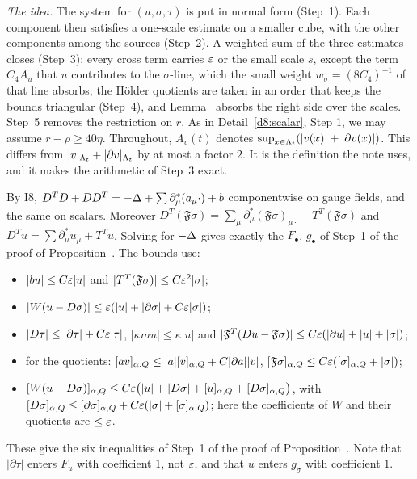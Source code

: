 \begin{detail}\label{d8:system}
\emph{The idea.} The system for $(u,\sigma,\tau)$ is put in normal form (Step~1). Each component then satisfies a one-scale estimate on a smaller cube, with the other components among the sources (Step~2). A weighted sum of the three estimates closes (Step~3): every cross term carries $\varepsilon$ or the small scale $s$, except the term $C_4A_u$ that $u$ contributes to the $\sigma$-line, which the small weight $w_\sigma=(8C_4)^{-1}$ of that line absorbs; the H\"older quotients are taken in an order that keeps the bounds triangular (Step~4), and Lemma~ absorbs the right side over the scales. Step~5 removes the restriction on $r$.
As in Detail~\ref{d8:scalar}, Step 1, we may assume $r-\rho\ge40\eta$. Throughout, $A_v(t)$ denotes $\sup_{x\in\Lambda_t}(|v(x)|+|\partial v(x)|)$. This differs from $|v|_{\Lambda_t}+|\partial v|_{\Lambda_t}$ by at most a factor $2$. It is the definition the note uses, and it makes the arithmetic of Step~3 exact.
\begin{step}
By I8, $D^TD+DD^T=-\Delta+\sum\partial^*_\mu(a_\mu\cdot)+b$ componentwise on gauge fields, and the same on scalars. Moreover $D^T(\mathfrak F\sigma)=\sum_\mu\partial^*_\mu(\mathfrak F\sigma)_{\mu\cdot}+T^T(\mathfrak F\sigma)$ and $D^Tu=\sum\partial^*_\mu u_\mu+T^Tu$. Solving  for $-\Delta$ gives exactly the $F_\bullet$, $g_\bullet$ of Step~1 of the proof of Proposition~. The bounds use:
\begin{itemize}
\item $|bu|\le C\varepsilon|u|$ and $|T^T(\mathfrak F\sigma)|\le C\varepsilon^2|\sigma|$;
\item $|W(u-D\sigma)|\le\varepsilon(|u|+|\partial\sigma|+C\varepsilon|\sigma|)$;
\item $|D\tau|\le|\partial\tau|+C\varepsilon|\tau|$, $|\kappa mu|\le\kappa|u|$ and $|\mathfrak F^T(Du-\mathfrak F\sigma)|\le C\varepsilon(|\partial u|+|u|+|\sigma|)$;
\item for the quotients: $[a v]_{\alpha,Q}\le|a|[v]_{\alpha,Q}+C|\partial a||v|$, $[\mathfrak F\sigma]_{\alpha,Q}\le C\varepsilon([\sigma]_{\alpha,Q}+|\sigma|)$;
\item $[W(u-D\sigma)]_{\alpha,Q}\le C\varepsilon\big(|u|+|D\sigma|+[u]_{\alpha,Q}+[D\sigma]_{\alpha,Q}\big)$, with $[D\sigma]_{\alpha,Q}\le[\partial\sigma]_{\alpha,Q}+C\varepsilon(|\sigma|+[\sigma]_{\alpha,Q})$; here the coefficients of $W$ and their quotients are $\le\varepsilon$.
\end{itemize}
These give the six inequalities of Step~1 of the proof of Proposition~. Note that $|\partial\tau|$ enters $F_u$ with coefficient $1$, not $\varepsilon$, and that $u$ enters $g_\sigma$ with coefficient $1$.

\end{step}
\end{detail}
